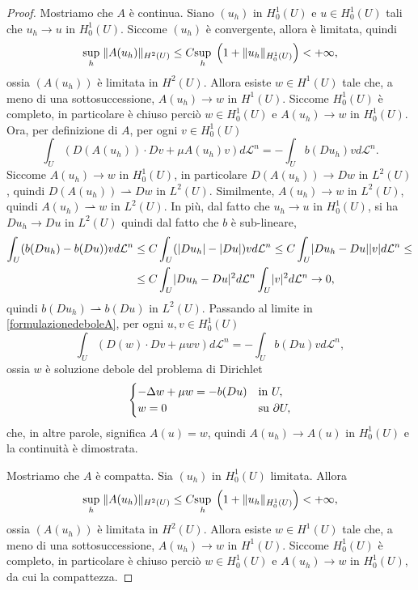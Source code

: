 \begin{proof}
	Mostriamo che $A$ è continua.  Siano $(u_h)$ in $H^1_0(U)$ e $u \in H^1_0(U)$ tali che $u_h \to u$ in $H^1_0(U)$. Siccome $(u_h)$ è convergente, allora è limitata, quindi 
	\[ \underset{h}{\sup}\; \lVert A(u_h)\rVert_{H^2(U)} \le C \underset{h}{\sup}\; \left( 1 + \lVert u_h\rVert_{H^1_0(U)}\right)  < +\infty, \]
	ossia $(A(u_h))$ è limitata in $H^2(U)$. Allora esiste $w \in H^1(U)$ tale che, a meno di una sottosuccessione, $A(u_h) \to w$ in $H^1(U)$. Siccome $H^1_0(U)$ è completo, in particolare è chiuso perciò $w \in H^1_0(U)$ e $A(u_h) \to w$ in $H^1_0(U)$. Ora, per definizione di $A$, per ogni $v \in H^1_0(U)$
	\begin{equation}\label{formulazionedeboleA}
		\int_U \left( D(A(u_h))\cdot Dv + \mu A(u_h)v\right) d\mathcal{L}^n = -\int_U b(Du_h)vd\mathcal{L}^n.
	\end{equation}
	Siccome $A(u_h) \to w$ in $H^1_0(U)$, in particolare $D(A(u_h)) \to Dw$ in $L^2(U)$, quindi $D(A(u_h)) \rightharpoonup Dw$ in $L^2(U)$. Similmente, $A(u_h) \to w$ in $L^2(U)$, quindi $A(u_h) \rightharpoonup w$ in $L^2(U)$. In più, dal fatto che $u_h \to u$ in $H^1_0(U)$, si ha $Du_h \to Du$ in $L^2(U)$ quindi dal fatto che $b$ è sub-lineare,
	\begin{align*}
	\int_U(b(Du_h)-b(Du))vd\mathcal{L}^n &\le C \int_U (\lvert Du_h\rvert-\lvert Du\rvert)vd\mathcal{L}^n \le C\int_U \lvert Du_h - Du\rvert\lvert v\rvert d\mathcal{L}^n \le \\
	&\le C\int_U \lvert Du_h - Du\rvert^2d\mathcal{L}^n \int_U \lvert v\rvert^2 d\mathcal{L}^n \to 0,
	\end{align*}
	quindi $b(Du_h) \rightharpoonup b(Du)$ in $L^2(U)$. Passando al limite in \eqref{formulazionedeboleA}, per ogni $u,v \in H^1_0(U)$
	\[ \int_U \left( D(w)\cdot Dv + \mu wv\right) d\mathcal{L}^n = -\int_U b(Du)vd\mathcal{L}^n, \]
	ossia $w$ è soluzione debole del problema di Dirichlet
	\[ \begin{cases}
		-\Delta w + \mu w = -b(Du) & \textup{in } U,\\
		w=0 & \textup{su } \partial U,
	\end{cases} \]
	che, in altre parole, significa $A(u) = w$, quindi $A(u_h) \to A(u)$ in $H^1_0(U)$ e la continuità è dimostrata.
	
	Mostriamo che $A$ è compatta. Sia $(u_h)$ in $H^1_0(U)$ limitata. Allora 
	\[ \underset{h}{\sup}\; \lVert A(u_h)\rVert_{H^2(U)} \le C \underset{h}{\sup}\; \left( 1 + \lVert u_h\rVert_{H^1_0(U)}\right)  < +\infty, \]
	ossia $(A(u_h))$ è limitata in $H^2(U)$. Allora esiste $w \in H^1(U)$ tale che, a meno di una sottosuccessione, $A(u_h) \to w$ in $H^1(U)$. Siccome $H^1_0(U)$ è completo, in particolare è chiuso perciò $w \in H^1_0(U)$ e $A(u_h) \to w$ in $H^1_0(U)$, da cui la compattezza.
	

\end{proof}
